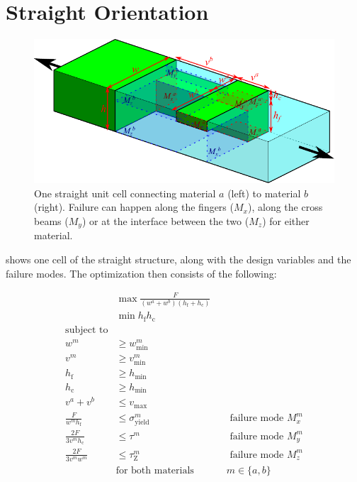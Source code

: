 \section{Straight Orientation}



\begin{figure}
	\centering
	\includegraphics[width=\columnwidth]{sources/method/straight_model_v3.pdf}
	\caption{
		One straight unit cell connecting material $a$ (left) to material $b$ (right).
		Failure can happen along the fingers ($M_x$), along the cross beams ($M_y$) or at the interface between the two ($M_z$) for either material.}
	\label{fig:failure_modes}
\end{figure}

 shows one cell of the straight structure, along with the design variables and the failure modes.
The optimization then consists of the following:

\begin{align}
	& \max \frac{F}{\left( w^a + w^b \right) \left( h_\text{f} + h_\text{c} \right) } \\
	& \min h_\text{f} h_\text{c} \\
	\text{subject to} & \nonumber \\
	w^m &\ge w_\text{min}^m \\
	v^m &\ge v_\text{min}^m \\
	h_\text{f} &\ge h_\text{min} \\
	h_\text{c} &\ge h_\text{min} \\
	v^a + v^b &\le v_\text{max} \\
	\frac{ F }{ w^m h_\text{f} } &\le \sigma^m_\text{yield} &&\text{ failure mode } M_x^m \\
	\frac{ 2 F }{ 3 v^m h_\text{c}} &\le \tau^m 			&&\text{ failure mode } M_y^m \\
	\frac{ 2 F }{ 3 v^m w^m } &\le \tau^m_\text{Z} 			&&\text{ failure mode } M_z^m \\
	& \text{for both materials } && m \in \{a, b\} \nonumber
\end{align}

